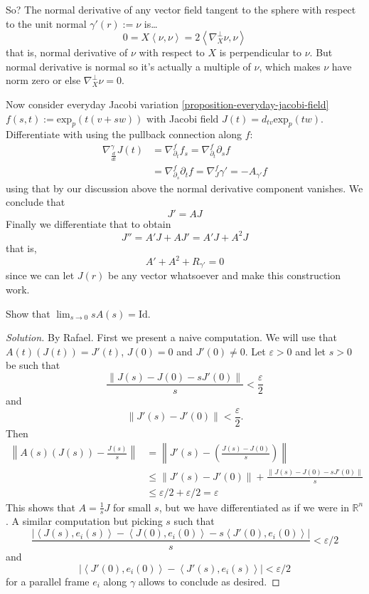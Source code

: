 \documentclass{book}
\begin{document}
So? The normal derivative of any vector field
tangent to the sphere with respect
to the unit normal $\gamma'(r):=\nu$ is…
$$
0=X\left\langle{}\nu,\nu\right\rangle{}=2\left\langle{}\nabla^\perp_X
\nu,\nu\right\rangle{}
$$
that is, normal derivative of $\nu$ with
respect to $X$ is perpendicular to
$\nu$. But normal derivative is normal so
it's actually a multiple of $\nu$,
which makes $\nu$ have norm zero or else
$\nabla^\perp_X \nu=0$.

Now consider everyday Jacobi variation
\ref{proposition-everyday-jacobi-field}
 $f(s,t):=\text{exp}_p(t(v+sw))$ with Jacobi
 field
$J(t)=d_{tv}\text{exp}_p(tw)$. Differentiate
with using the pullback connection
along $f$:
$$
\begin{aligned}
\nabla_{\frac{d}{dt}}^\gamma
J(t)&=\nabla_{\partial_t}^ff_s=
\nabla_{\partial_t}^f
\partial_sf\\
&=\nabla_{\partial_s}^f \partial_t
f=\nabla_{J}^f \gamma' = -A_{\gamma'}f
\end{aligned}
$$
using that by our discussion above the normal
derivative component vanishes. We
conclude that
\begin{equation}
\label{equation-jacob-field-deriv-shape}
J'=AJ
\end{equation}
Finally we differentiate that to obtain
$$
J''=A'J+AJ'=A'J+A^2J
$$
that is,
\begin{equation}
\label{equation-Riccati}
A'+A^2+R_{\gamma'}=0
\end{equation}
since we can let $J(r)$ be any vector
whatsoever and make this construction
work.
\begin{exercise}
\label{exercise-limit-of-shape-operator}
Show that $\lim_{s\to0}sA(s)=\text{Id}$.
\end{exercise}

\begin{proof}[Solution]
By Rafael. First we present a naive
computation. We will use that
$A(t)(J(t))=J'(t)$,  $J(0)=0$ and $J'(0)\neq
0$. Let $\varepsilon>0$ and let
$s>0$ be such that
$$
\frac{\|J(s)-J(0)-sJ'(0)\|}{s}
<\frac{\varepsilon}{2}
$$
and
$$
\|J'(s)-J'(0)\|<\frac{\varepsilon}{2}.
$$
Then
$$
\begin{aligned}
\left\|A(s)(J(s))-\frac{J(s)}{s}\right\|&
=\left\|J'(s)-\left(\frac{J(s)-J(0)}{s}
\right)\right\|\\
&\leq
\|J'(s)-J'(0)\|+\frac{\|J(s)-J(0)-sJ'(0)\|}
{s}\\
&\leq\varepsilon/2+\varepsilon/2=\varepsilon
\end{aligned}
$$
This shows that $A=\frac{1}{s}J$ for small
$s$, but we have differentiated as if
we were in $\mathbb{R}^n$. A similar
computation but picking $s$ such that
$$
\frac{|\left\langle{}J(s),e_i(s)\right\rangle{}-\left\langle{}J(0),
e_i(0)\right\rangle{}
-s\left\langle{}J'(0),e_i(0)\right\rangle{}|}{s}<\varepsilon/
2
$$
and
$$
|\left\langle{}J'(0),e_i(0)\right\rangle{}-\left\langle{}J'(s),e_i(s)
\right\rangle{}|<\varepsilon/2
$$
for a parallel frame $e_i$ along $\gamma$
allows to conclude as desired.
\end{proof}
\end{document}
